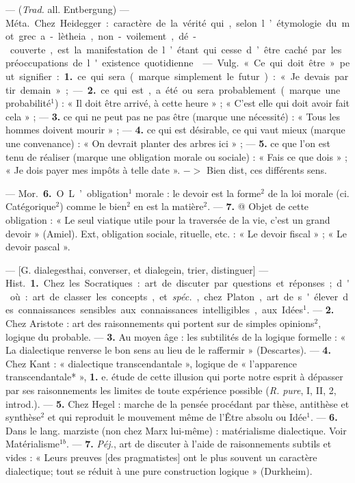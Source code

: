 \begin{itemize}[leftmargin=1cm, label=, itemsep=1pt]
 — ({\it Trad.} all. Entbergung)
— \si{Méta.} Chez Heidegger : caractère
de la vérité qui, selon l’étymologie
du mot grec a-lètheia, non-voilement, dé-couverte, est la manifestation de l’étant qui cesse d’être
caché par les préoccupations de
l'existence quotidienne.

 — \si{Vulg.} « Ce qui doit
être » peut signifier : {\bf 1.} ce qui sera
(marque simplement le futur) : « Je
devais partir demain » ; — {\bf 2.} ce qui
est, a été ou sera probablement
(marque une probabilité$^1$) : « Il doit
être arrivé, à cette heure » ; « C’est
elle qui doit avoir fait cela » ; — {\bf 3.} ce
qui ne peut pas ne pas être (marque
une nécessité) : « Tous les hommes
doivent mourir » ; — {\bf 4.} ce qui est
désirable, ce qui vaut mieux (marque
une convenance) : « On devrait
planter des arbres ici » ; — {\bf 5.} ce que
l’on est tenu de réaliser (marque une
obligation morale ou sociale) : « Fais
ce que dois » ; « Je dois payer mes
impôts à telle date ». $->$ Bien dist,
ces différents sens.

 — \si{Mor.} {\bf 6.} O L’obligation$^1$ morale : le devoir est la forme$^2$
de la loi morale (ci. Catégorique$^2$)
comme le bien$^2$ en est la matière$^2$. —
 {\bf 7.} @ Objet de cette obligation : « Le
seul viatique utile pour la traversée
de la vie, c’est un grand devoir »
(Amiel). Ext, obligation sociale,
rituelle, etc. : « Le devoir fiscal » ;
« Le devoir pascal ».

 — [G. dialegesthai, converser, et dialegein, trier, distinguer]
— \si{Hist.} {\bf 1.} Chez les Socratiques : art
de discuter par questions et réponses ; d'où : art de classer les concepts,
et {\it spéc.}, chez Platon, art de s'élever
des connaissances sensibles aux
connaissances intelligibles, aux
Idées$^1$. — {\bf 2.} Chez Aristote : art des
raisonnements qui portent sur de
simples opinions$^2$, logique du probable. — {\bf 3.} Au moyen âge : les subtilités de la logique formelle : « La
dialectique renverse le bon sens au
lieu de le raffermir » (Descartes). —
 {\bf 4.} Chez Kant : « dialectique transcendantale », logique de « l’apparence transcendantale* », {\bf 1.} e. étude
de cette illusion qui porte notre
esprit à dépasser par ses raisonnements les limites de toute expérience possible ({\it R. pure}, I, II, 2,
introd.). — {\bf 5.} Chez Hegel : marche de
la pensée procédant par thèse, antithèse et synthèse$^2$ et qui reproduit
le mouvement même de l’Être
absolu ou Idée$^1$. — {\bf 6.} Dans le lang.
marziste (non chez Marx lui-même) :
matérialisme dialectique. Voir Matérialisme$^{1b}$. — {\bf 7.} {\it Péj.}, art de discuter
à l’aide de raisonnements subtils et
vides : « Leurs preuves [des pragmatistes] ont le plus souvent un caractère
dialectique; tout se réduit à une pure
construction logique » (Durkheim).


\end{itemize}

